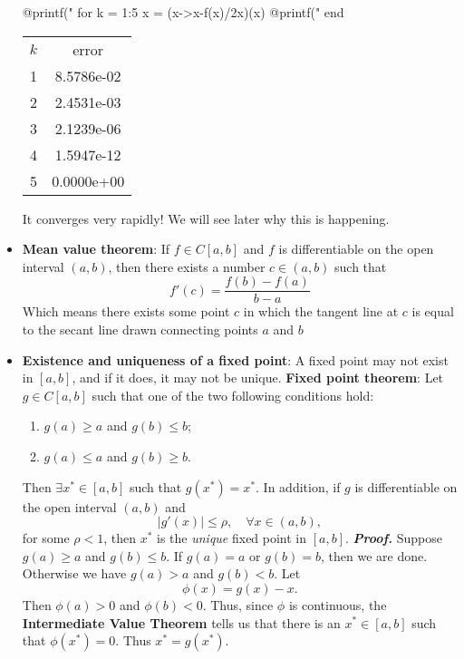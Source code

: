 \documentclass{report}
\begin{document}
\begin{itemize}
\begin{jlcode}
@printf("%
for k = 1:5
    x = (x->x-f(x)/2x)(x)
    @printf("%
end
    \end{jlcode}
    \bigbreak \noindent 
    \begin{center}
        \begin{tabular}{cc}
            $k$ &error \\
            1   &8.5786e-02 \\
            2   &2.4531e-03 \\
            3   &2.1239e-06 \\
            4   &1.5947e-12 \\
            5   &0.0000e+00
        \end{tabular}
    \end{center}
    \bigbreak \noindent 
    It converges very rapidly! We will see later why this is happening.
\item \textbf{Mean value theorem}: If $f \in C[a,b]$ and $f$ is differentiable on the open interval $(a,b)$, then there exists a number $c \in (a,b)$ such that 
$$f'(c) = \frac{f(b)-f(a)}{b-a}$$
\bigbreak \noindent 
Which means there exists some point $c$ in which the tangent line at $c$ is equal to the secant line drawn connecting points $a$ and $b$
\item \textbf{Existence and uniqueness of a fixed point}: A fixed point may not exist in $[a,b]$, and if it does, it may not be unique.
    \bigbreak \noindent 
    \textbf{Fixed point theorem}:
    Let $g \in C[a,b]$ such that one of the two following conditions hold:
    \begin{enumerate}
        \item $g(a) \geq a$ and $g(b) \leq b$;
        \item $g(a) \leq a$ and $g(b) \geq b$.
    \end{enumerate}
    Then $\exists x^* \in [a,b]$ such that $g(x^*) = x^*$.
    In addition, if $g$ is differentiable on the open interval $(a,b)$ and 
    $$\left|g'(x)\right| \leq \rho, \quad \forall x \in (a,b),$$
    for some $\rho < 1$, then $x^*$ is the \textit{unique} fixed point in $[a,b]$.
    \bigbreak \noindent 
    \textbf{\textit{Proof.}}  Suppose $g(a) \geq a$ and $g(b) \leq b$. If $g(a) = a$ or $g(b) = b$, then we are done. Otherwise we have $g(a) > a$ and $g(b) < b$.
    Let
    $$\phi(x) = g(x) - x.$$
    Then $\phi(a) > 0$ and $\phi(b) < 0$. Thus, since $\phi$ is continuous, the \textbf{Intermediate Value Theorem} tells us that there is an $x^* \in [a,b]$ such that $\phi(x^*) = 0$. Thus $x^* = g(x^*)$.

\end{itemize}
\end{document}
